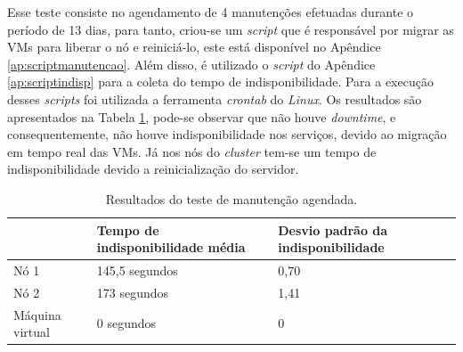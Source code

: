 
Esse teste consiste no agendamento de 4 manutenções efetuadas durante o período de 13 dias, para tanto, criou-se um \textit{script} que é 
responsável por migrar as \acp{VM} para liberar o nó e reiniciá-lo, este está disponível no Apêndice \ref{ap:scriptmanutencao}. 
Além disso, é utilizado o \textit{script} do Apêndice \ref{ap:scriptindisp} para a coleta do tempo de indisponibilidade. 
Para a execução desses \textit{scripts} foi utilizada a ferramenta \textit{crontab} do \textit{Linux}. 
Os resultados são apresentados na Tabela \ref{tab:teste3resultados}, pode-se observar que não houve \textit{downtime}, e consequentemente, não 
houve indisponibilidade nos serviços, devido ao migração em tempo real das \acp{VM}. Já nos nós do \textit{cluster} tem-se um tempo de 
indisponibilidade devido a reinicialização do servidor.


\begin{table}[h!]
\caption{Resultados do teste de manutenção agendada.}
\label{tab:teste3resultados}
\begin{center}
\begin{tabular}{|l|l|l|}\hline
 & \textbf{Tempo de indisponibilidade média} & \textbf{Desvio padrão da indisponibilidade} \\\hline
Nó 1 & 145,5 segundos & 0,70 \\\hline
Nó 2 & 173 segundos & 1,41 \\\hline
Máquina virtual & 0 segundos & 0 \\\hline
\end{tabular}
\end{center}
\end{table}

